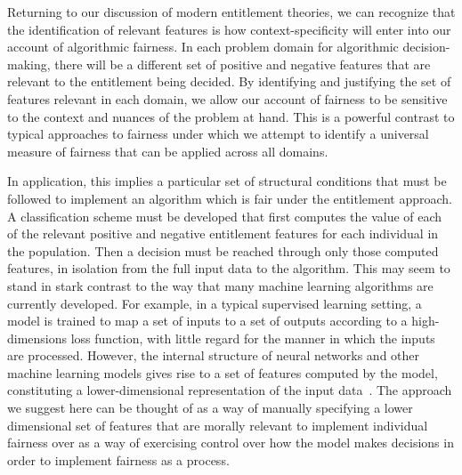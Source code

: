 Returning to our discussion of modern entitlement theories, we can recognize
that the identification of relevant features is how context-specificity will
enter into our account of algorithmic fairness. In each problem domain for 
algorithmic decision-making, there will be a different set of positive and
negative features that are relevant to the entitlement being decided. By
identifying and justifying the set of features relevant in each domain, we
allow our account of fairness to be sensitive to the context and nuances of the
problem at hand. This is a powerful contrast to typical approaches to fairness
under which we attempt to identify a universal measure of fairness that can be
applied across all domains.

In application, this implies a particular set of structural conditions that must
be followed to implement an algorithm which is fair under the entitlement
approach. A classification scheme must be developed that first computes the
value of each of the relevant positive and negative entitlement features for
each individual in the population. Then a decision must be reached through only
those computed features, in isolation from the full input data to the algorithm.
This may seem to stand in stark contrast to the way that many machine learning
algorithms are currently developed. For example, in a typical supervised
learning setting, a model is trained to map a set of inputs to a set of outputs
according to a high-dimensions loss function, with little regard for the
manner in which the inputs are processed. However, the internal structure of
neural networks and other machine learning models gives rise to a set of
features computed by the model, constituting a lower-dimensional representation
of the input data~\citep{Liu_2018}. The approach we suggest here can be thought
of as a way of manually specifying a lower dimensional set of features that
are morally relevant to implement individual fairness over as a way of
exercising control over how the model makes decisions in order to implement
fairness as a process.

